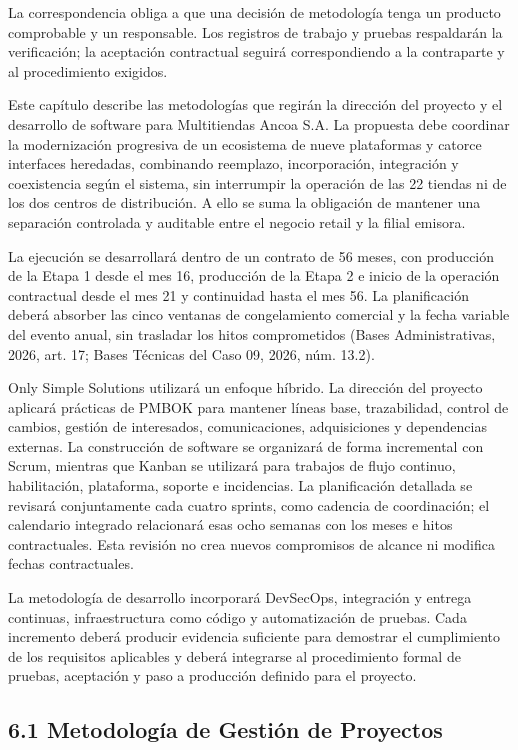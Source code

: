 \documentclass[11pt]{article}
\begin{document}
La correspondencia obliga a que una decisión de metodología tenga un
producto comprobable y un responsable. Los registros de trabajo y
pruebas respaldarán la verificación; la aceptación contractual seguirá
correspondiendo a la contraparte y al procedimiento exigidos.

Este capítulo describe las metodologías que regirán la dirección del
proyecto y el desarrollo de software para Multitiendas Ancoa S.A. La
propuesta debe coordinar la modernización progresiva de un ecosistema de
nueve plataformas y catorce interfaces heredadas, combinando reemplazo,
incorporación, integración y coexistencia según el sistema, sin
interrumpir la operación de las 22 tiendas ni de los dos centros de
distribución. A ello se suma la obligación de mantener una separación
controlada y auditable entre el negocio retail y la filial emisora.

La ejecución se desarrollará dentro de un contrato de 56 meses, con
producción de la Etapa 1 desde el mes 16, producción de la Etapa 2 e
inicio de la operación contractual desde el mes 21 y continuidad hasta
el mes 56. La planificación deberá absorber las cinco ventanas de
congelamiento comercial y la fecha variable del evento anual, sin
trasladar los hitos comprometidos (Bases Administrativas, 2026, art. 17;
Bases Técnicas del Caso 09, 2026, núm. 13.2).

Only Simple Solutions utilizará un enfoque híbrido. La dirección del
proyecto aplicará prácticas de PMBOK para mantener líneas base,
trazabilidad, control de cambios, gestión de interesados,
comunicaciones, adquisiciones y dependencias externas. La construcción
de software se organizará de forma incremental con Scrum, mientras que
Kanban se utilizará para trabajos de flujo continuo, habilitación,
plataforma, soporte e incidencias. La planificación detallada se
revisará conjuntamente cada cuatro sprints, como cadencia de
coordinación; el calendario integrado relacionará esas ocho semanas con
los meses e hitos contractuales. Esta revisión no crea nuevos
compromisos de alcance ni modifica fechas contractuales.

La metodología de desarrollo incorporará DevSecOps, integración y
entrega continuas, infraestructura como código y automatización de
pruebas. Cada incremento deberá producir evidencia suficiente para
demostrar el cumplimiento de los requisitos aplicables y deberá
integrarse al procedimiento formal de pruebas, aceptación y paso a
producción definido para el proyecto.

\subsection{6.1 Metodología de Gestión de Proyectos}\label{6-1-metodologia-de-gestion-de-proyectos}
\end{document}
